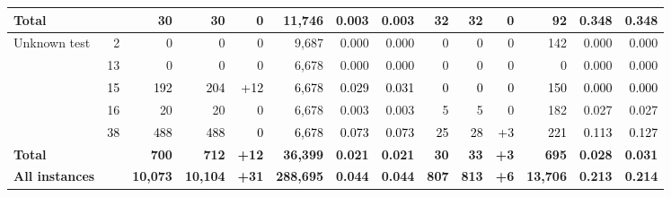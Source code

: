 \begin{xltabular}{\linewidth}{l r r r r r r r r r r r r r}
    \textbf{Total} & & \textbf{30} & \textbf{30} & \textbf{0} & \textbf{11,746} & \textbf{0.003} & \textbf{0.003} & \textbf{32} & \textbf{32} & \textbf{0} & \textbf{92} & \textbf{0.348} & \textbf{0.348} \\
  \midrule
    \textcolor{muted}{Unknown test} & \textcolor{muted}{2} & \textcolor{muted}{0} & \textcolor{muted}{0} & \textcolor{muted}{0} & \textcolor{muted}{9,687} & \textcolor{muted}{0.000} & \textcolor{muted}{0.000} & \textcolor{muted}{0} & \textcolor{muted}{0} & \textcolor{muted}{0} & \textcolor{muted}{142} & \textcolor{muted}{0.000} & \textcolor{muted}{0.000} \\
     & \textcolor{muted}{13} & \textcolor{muted}{0} & \textcolor{muted}{0} & \textcolor{muted}{0} & \textcolor{muted}{6,678} & \textcolor{muted}{0.000} & \textcolor{muted}{0.000} & \textcolor{muted}{0} & \textcolor{muted}{0} & \textcolor{muted}{0} & \textcolor{muted}{0} & \textcolor{muted}{0.000} & \textcolor{muted}{0.000} \\
     & \textcolor{black}{15} & \textcolor{black}{192} & \textcolor{black}{204} & \textcolor{black}{+12} & \textcolor{black}{6,678} & \textcolor{black}{0.029} & \textcolor{black}{0.031} & \textcolor{black}{0} & \textcolor{black}{0} & \textcolor{black}{0} & \textcolor{black}{150} & \textcolor{black}{0.000} & \textcolor{black}{0.000} \\
     & \textcolor{muted}{16} & \textcolor{muted}{20} & \textcolor{muted}{20} & \textcolor{muted}{0} & \textcolor{muted}{6,678} & \textcolor{muted}{0.003} & \textcolor{muted}{0.003} & \textcolor{muted}{5} & \textcolor{muted}{5} & \textcolor{muted}{0} & \textcolor{muted}{182} & \textcolor{muted}{0.027} & \textcolor{muted}{0.027} \\
     & \textcolor{black}{38} & \textcolor{black}{488} & \textcolor{black}{488} & \textcolor{black}{0} & \textcolor{black}{6,678} & \textcolor{black}{0.073} & \textcolor{black}{0.073} & \textcolor{black}{25} & \textcolor{black}{28} & \textcolor{black}{+3} & \textcolor{black}{221} & \textcolor{black}{0.113} & \textcolor{black}{0.127} \\
    \textbf{Total} & & \textbf{700} & \textbf{712} & \textbf{+12} & \textbf{36,399} & \textbf{0.021} & \textbf{0.021} & \textbf{30} & \textbf{33} & \textbf{+3} & \textbf{695} & \textbf{0.028} & \textbf{0.031} \\
    \midrule
    \textbf{All instances} & & \textbf{10,073} & \textbf{10,104} & \textbf{+31} & \textbf{288,695} & \textbf{0.044} & \textbf{0.044} & \textbf{807} & \textbf{813} & \textbf{+6} & \textbf{13,706} & \textbf{0.213} & \textbf{0.214} \\
    \bottomrule
  \end{xltabular}


